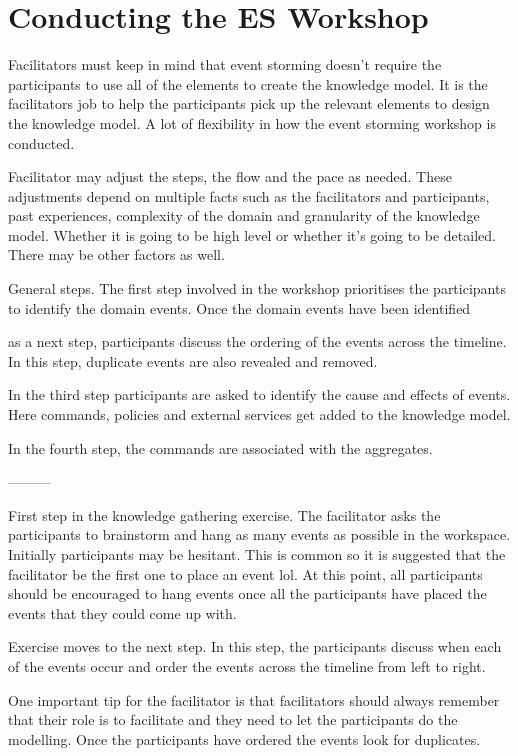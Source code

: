 \section{Conducting the ES Workshop}

Facilitators must keep in mind that event storming doesn't require the participants to use all of the elements to create the knowledge model.
It is the facilitators job to help the participants pick up the relevant elements to design the knowledge model.
A lot of flexibility in how the event storming workshop is conducted.

Facilitator may adjust the steps, the flow and the pace as needed.
These adjustments depend on multiple facts such as the facilitators and participants, past experiences, complexity of the domain and granularity of the knowledge model.
Whether it is going to be high level or whether it's going to be detailed.
There may be other factors as well.

General steps.
The first step involved in the workshop prioritises the participants to identify the domain events.
Once the domain events have been identified

as a next step, participants discuss the ordering of the events across the timeline.
In this step, duplicate events are also revealed and removed.

In the third step participants are asked to identify the cause and effects of events.
Here commands, policies and external services get added to the knowledge model.

In the fourth step, the commands are associated with the aggregates.

---------

First step in the knowledge gathering exercise.
The facilitator asks the participants to brainstorm and hang as many events as possible in the workspace.
Initially participants may be hesitant.
This is common so it is suggested that the facilitator be the first one to place an event lol.
At this point, all participants should be encouraged to hang events once all the participants have placed the events that they could come up with.

Exercise moves to the next step.
In this step, the participants discuss when each of the events occur and order the events across the timeline from left to right.

One important tip for the facilitator is that facilitators should always remember that their role is to facilitate and they need to let the participants do the modelling.
Once the participants have ordered the events look for duplicates.

